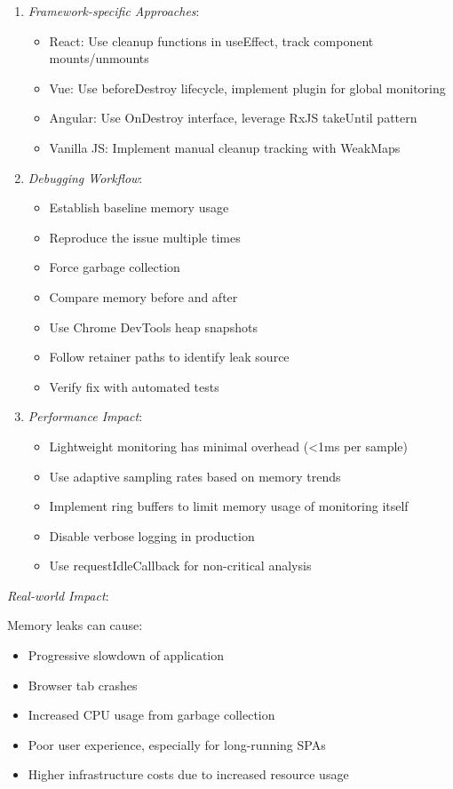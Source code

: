 \documentclass[11pt]{article}
\begin{document}
\begin{enumerate}
\item \emph{Framework-specific Approaches}:

\begin{itemize}
\item React: Use cleanup functions in useEffect, track component mounts/unmounts
\item Vue: Use beforeDestroy lifecycle, implement plugin for global monitoring
\item Angular: Use OnDestroy interface, leverage RxJS takeUntil pattern
\item Vanilla JS: Implement manual cleanup tracking with WeakMaps
\end{itemize}

\item \emph{Debugging Workflow}:

\begin{itemize}
\item Establish baseline memory usage
\item Reproduce the issue multiple times
\item Force garbage collection
\item Compare memory before and after
\item Use Chrome DevTools heap snapshots
\item Follow retainer paths to identify leak source
\item Verify fix with automated tests
\end{itemize}

\item \emph{Performance Impact}:

\begin{itemize}
\item Lightweight monitoring has minimal overhead (<1ms per sample)
\item Use adaptive sampling rates based on memory trends
\item Implement ring buffers to limit memory usage of monitoring itself
\item Disable verbose logging in production
\item Use requestIdleCallback for non-critical analysis
\end{itemize}
\end{enumerate}

\emph{Real-world Impact}:

Memory leaks can cause:

\begin{itemize}
\item Progressive slowdown of application
\item Browser tab crashes
\item Increased CPU usage from garbage collection
\item Poor user experience, especially for long-running SPAs
\item Higher infrastructure costs due to increased resource usage
\end{itemize}
\end{document}
